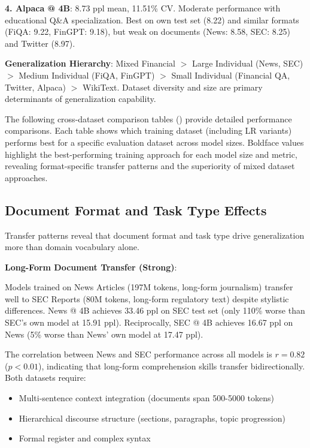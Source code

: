 \textbf{4. Alpaca @ 4B}: 8.73 ppl mean, 11.51\% CV. Moderate performance with educational Q\&A specialization. Best on own test set (8.22) and similar formats (FiQA: 9.22, FinGPT: 9.18), but weak on documents (News: 8.58, SEC: 8.25) and Twitter (8.97).

\textbf{Generalization Hierarchy}: Mixed Financial $>$ Large Individual (News, SEC) $>$ Medium Individual (FiQA, FinGPT) $>$ Small Individual (Financial QA, Twitter, Alpaca) $>$ WikiText. Dataset diversity and size are primary determinants of generalization capability.

The following cross-dataset comparison tables () provide detailed performance comparisons. Each table shows which training dataset (including LR variants) performs best for a specific evaluation dataset across model sizes. Boldface values highlight the best-performing training approach for each model size and metric, revealing format-specific transfer patterns and the superiority of mixed dataset approaches.

\subsection{Document Format and Task Type Effects}

Transfer patterns reveal that document format and task type drive generalization more than domain vocabulary alone.

\textbf{Long-Form Document Transfer (Strong)}:

Models trained on News Articles (197M tokens, long-form journalism) transfer well to SEC Reports (80M tokens, long-form regulatory text) despite stylistic differences. News @ 4B achieves 33.46 ppl on SEC test set (only 110\% worse than SEC's own model at 15.91 ppl). Reciprocally, SEC @ 4B achieves 16.67 ppl on News (5\% worse than News' own model at 17.47 ppl).

The correlation between News and SEC performance across all models is $r = 0.82$ ($p < 0.01$), indicating that long-form comprehension skills transfer bidirectionally. Both datasets require:
\begin{itemize}
\item Multi-sentence context integration (documents span 500-5000 tokens)
\item Hierarchical discourse structure (sections, paragraphs, topic progression)
\item Formal register and complex syntax
\end{itemize}

